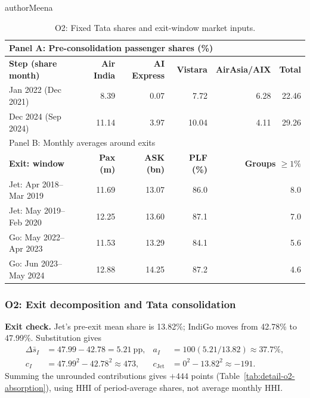 \begin{mergedcontribution}{authorMeena}
\begin{table}[H]
\centering
\color{authorMeena}
\caption{O2: Fixed Tata shares and exit-window market inputs.}\label{tab:o2-tata}\label{tab:o2-market}
\fontsize{10}{12}\selectfont{}\setlength{\tabcolsep}{3pt}
\renewcommand{\arraystretch}{1.15}
\begin{tabular}{|l|r|r|r|r|r|}
\hline
\multicolumn{6}{|l|}{Panel A: Pre-consolidation passenger shares (\%)}\\
\hline
\textbf{Step (share month)} & \textbf{Air India} & \textbf{AI Express} & \textbf{Vistara} & \textbf{AirAsia/AIX} & \textbf{Total}\\
\hline
Jan 2022 (Dec 2021) & 8.39 & 0.07 & 7.72 & 6.28 & 22.46\\
\hline
Dec 2024 (Sep 2024) & 11.14 & 3.97 & 10.04 & 4.11 & 29.26\\
\hline
\multicolumn{6}{|l|}{Panel B: Monthly averages around exits}\\
\hline
\textbf{Exit: window} & \textbf{Pax (m)} & \textbf{ASK (bn)} & \textbf{PLF (\%)} & \multicolumn{2}{r|}{\textbf{Groups $\geq1\%$}}\\
\hline
Jet: Apr 2018--Mar 2019 & 11.69 & 13.07 & 86.0 & \multicolumn{2}{r|}{8.0}\\
\hline
Jet: May 2019--Feb 2020 & 12.25 & 13.60 & 87.1 & \multicolumn{2}{r|}{7.0}\\
\hline
Go: May 2022--Apr 2023 & 11.53 & 13.29 & 84.1 & \multicolumn{2}{r|}{5.6}\\
\hline
Go: Jun 2023--May 2024 & 12.88 & 14.25 & 87.2 & \multicolumn{2}{r|}{4.6}\\
\hline
\end{tabular}
\end{table}

\subsubsection{O2: Exit decomposition and Tata consolidation}
\label{app:workings}
\textbf{Exit check.} Jet's pre-exit mean share is 13.82\%; IndiGo moves from 42.78\% to 47.99\%. Substitution gives
\[
\begin{aligned}
\Delta\bar s_I&=47.99-42.78=5.21\ \mathrm{pp}, &
a_I&=100(5.21/13.82)\approx37.7\%,\\
c_I&=47.99^2-42.78^2\approx473, &
c_{\mathrm{Jet}}&=0^2-13.82^2\approx-191.
\end{aligned}
\]
Summing the unrounded contributions gives $+444$ points (Table~\ref{tab:detail-o2-absorption}), using HHI of period-average shares, not average monthly HHI.


\end{mergedcontribution}

